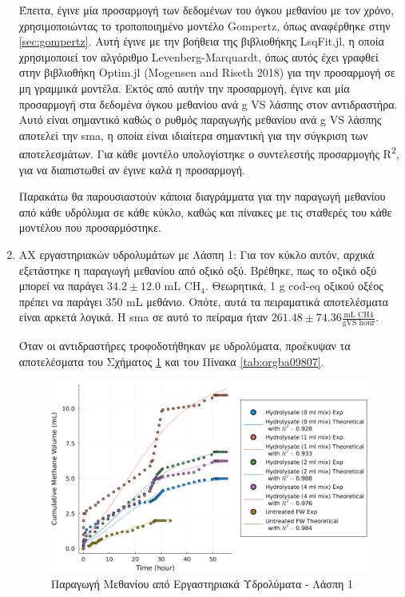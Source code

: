 \documentclass[11pt]{report}
\makeatletter
\newcommand{\citeprocitem}[2]{\hyper@linkstart{cite}{citeproc_bib_item_#1}#2\hyper@linkend}
\makeatother
\begin{document}
\begin{enumerate}
Έπειτα, έγινε μία προσαρμογή των δεδομένων του όγκου μεθανίου με τον χρόνο, χρησιμοποιώντας το τροποποιημένο μοντέλο Gompertz, όπως αναφέρθηκε στην \autoref{sec:gompertz}. Αυτή έγινε με την βοήθεια της βιβλιοθήκης LsqFit.jl, η οποία χρησιμοποιεί τον αλγόριθμο Levenberg-Marquardt, όπως αυτός έχει γραφθεί στην βιβλιοθήκη Optim.jl (\citeprocitem{47}{Mogensen and Riseth 2018}) για την προσαρμογή σε μη γραμμικά μοντέλα. Εκτός από αυτήν την προσαρμογή, έγινε και μία προσαρμογή στα δεδομένα όγκου μεθανίου ανά g VS λάσπης στον αντιδραστήρα. Αυτό είναι σημαντικό καθώς ο ρυθμός παραγωγής μεθανίου ανά g VS λάσπης αποτελεί την \acrfull{sma}, η οποία είναι ιδιαίτερα σημαντική για την σύγκριση των αποτελεσμάτων. Για κάθε μοντέλο υπολογίστηκε ο συντελεστής προσαρμογής R\textsuperscript{2}, για να διαπιστωθεί αν έγινε καλά η προσαρμογή.

Παρακάτω θα παρουσιαστούν κάποια διαγράμματα για την παραγωγή μεθανίου από κάθε υδρόλυμα σε κάθε κύκλο, καθώς και πίνακες με τις σταθερές του κάθε μοντέλου που προσαρμόστηκε.

\item ΑΧ εργαστηριακών υδρολυμάτων με Λάσπη 1:
\label{sec:orga417ba6}
Για τον κύκλο αυτόν, αρχικά εξετάστηκε η παραγωγή μεθανίου από οξικό οξύ. Βρέθηκε, πως το οξικό οξύ μπορεί να παράγει \(34.2 \pm 12.0 \text{ mL CH$_4$}\). Θεωρητικά, 1 g \acrshort{cod}-eq οξικού οξέος πρέπει να παράγει 350 mL μεθάνιο. Οπότε, αυτά τα πειραματικά αποτελέσματα είναι αρκετά λογικά. Η \acrshort{sma} σε αυτό το πείραμα ήταν \(261.48 \pm 74.36 \frac{\text{mL CH4}}{\text{gVS hour}}\).

Όταν οι αντιδραστήρες τροφοδοτήθηκαν με υδρολύματα, προέκυψαν τα αποτελέσματα του Σχήματος \ref{fig:orge523d51} και του Πίνακα \ref{tab:orgba09807}.

\begin{figure}[htbp]
\centering
\includegraphics[width=.9\linewidth]{../plots/BMPs/methane_s1_r1_comp.png}
\caption{\label{fig:orge523d51}Παραγωγή Μεθανίου από Εργαστηριακά Υδρολύματα - Λάσπη 1}
\end{figure}


\end{enumerate}
\end{document}
